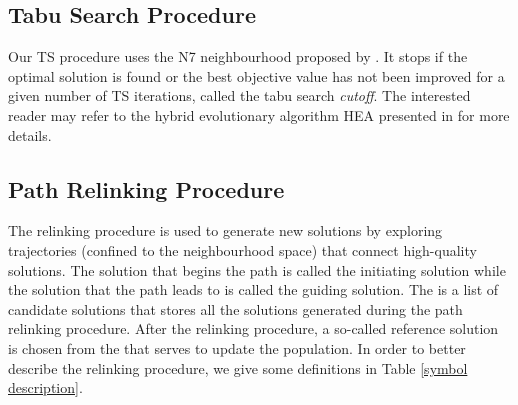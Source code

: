 \documentclass[authoryear,12pt]{elsarticle}
\begin{document}
\subsection{Tabu Search Procedure}
\label{subsec TS}


Our TS procedure uses the N7 neighbourhood proposed by \cite{Zhang2007TS}. It stops if the optimal solution is found or the best objective value has not been improved for a given number of TS iterations, called the tabu search \textsl{cutoff}. The interested reader may refer to the hybrid evolutionary algorithm HEA presented in \cite{Cheng2013HEA} for more details.

\subsection{Path Relinking Procedure}
\label{subsec PR}

The relinking procedure is used to generate new solutions by exploring trajectories (confined to the neighbourhood space) that connect high-quality solutions. The solution that begins the path is called the initiating solution while the solution that the path leads to is called the guiding solution. The  is a list of candidate solutions that stores all the solutions generated during the path relinking procedure. After the relinking procedure, a so-called reference solution is chosen from the  that serves to update the population. In order to better describe the relinking procedure, we give some definitions in Table \ref{symbol description}.
\end{document}
